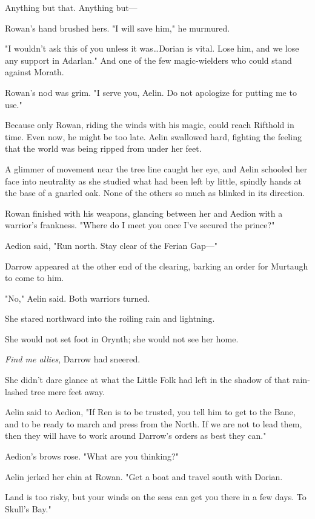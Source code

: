 Anything but that.
Anything but---

Rowan's hand brushed hers.
"I will save him," he murmured.

"I wouldn't ask this of you unless it was\ldots Dorian is vital.
Lose him, and we lose any support in Adarlan."
And one of the few magic-wielders who could stand against Morath.

Rowan's nod was grim.
"I serve you, Aelin.
Do not apologize for putting me to use."

Because only Rowan, riding the winds with his magic, could reach Rifthold in time.
Even now, he might be too late.
Aelin swallowed hard, fighting the feeling that the world was being ripped from under her feet.

A glimmer of movement near the tree line caught her eye, and Aelin schooled her face into neutrality as she studied what had been left by little, spindly hands at the base of a gnarled oak.
None of the others so much as blinked in its direction.

Rowan finished with his weapons, glancing between her and Aedion with a warrior's frankness.
"Where do I meet you once I've secured the prince?"

Aedion said, "Run north.
Stay clear of the Ferian Gap---"

Darrow appeared at the other end of the clearing, barking an order for Murtaugh to come to him.

"No," Aelin said.
Both warriors turned.

She stared northward into the roiling rain and lightning.

She would not set foot in Orynth; she would not see her home.

\emph{Find me allies}, Darrow had sneered.

She didn't dare glance at what the Little Folk had left in the shadow of that rain-lashed tree mere feet away.

Aelin said to Aedion, "If Ren is to be trusted, you tell him to get to the Bane, and to be ready to march and press from the North.
If we are not to lead them, then they will have to work around Darrow's orders as best they can."

Aedion's brows rose.
"What are you thinking?"

Aelin jerked her chin at Rowan.
"Get a boat and travel south with Dorian.

Land is too risky, but your winds on the seas can get you there in a few days.
To Skull's Bay."

